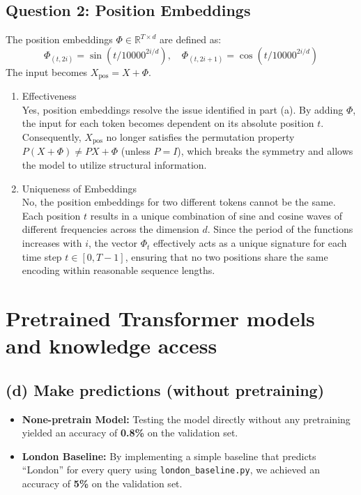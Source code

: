 \documentclass{article}
\begin{document}
\subsection*{Question 2: Position Embeddings}

The position embeddings $\Phi \in \mathbb{R}^{T \times d}$ are defined as:
\begin{equation}
    \Phi_{(t, 2i)} = \sin(t/10000^{2i/d}), \quad \Phi_{(t, 2i+1)} = \cos(t/10000^{2i/d})
\end{equation}
The input becomes $X_{\text{pos}} = X + \Phi$.

\begin{enumerate}
    \item[i.] Effectiveness \\
    Yes, position embeddings resolve the issue identified in part (a). By adding $\Phi$, the input for each token becomes dependent on its absolute position $t$. Consequently, $X_{\text{pos}}$ no longer satisfies the permutation property $P(X+\Phi) \neq PX + \Phi$ (unless $P=I$), which breaks the symmetry and allows the model to utilize structural information.

    \item[ii.] Uniqueness of Embeddings \\
    No, the position embeddings for two different tokens cannot be the same. Each position $t$ results in a unique combination of sine and cosine waves of different frequencies across the dimension $d$. Since the period of the functions increases with $i$, the vector $\Phi_t$ effectively acts as a unique signature for each time step $t \in [0, T-1]$, ensuring that no two positions share the same encoding within reasonable sequence lengths.
\end{enumerate}

\section{Pretrained Transformer models and knowledge access}

\subsection*{(d) Make predictions (without pretraining)}
\begin{itemize}
    \item \textbf{None-pretrain Model:} Testing the model directly without any pretraining yielded an accuracy of \textbf{0.8\%} on the validation set. 
    \item \textbf{London Baseline:} By implementing a simple baseline that predicts ``London'' for every query using \texttt{london\_baseline.py}, we achieved an accuracy of \textbf{5\%} on the validation set. 
\end{itemize}
\end{document}
